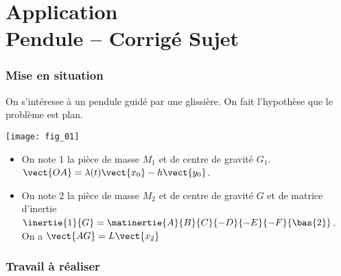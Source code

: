 \chapter*{Application  \\ 
Pendule -- \ifprof Corrigé \else Sujet \fi}

\iflivret {} \else
\ifprof  {} \else \fi
\fi

\setcounter{question}{0}
\marginnote{}



\subsection*{Mise en situation}
On s'intéresse à un pendule guidé par une glissière. On fait l'hypothèse que le problème est plan. 

\begin{marginfigure}
\texttt{[image: fig\_01]}
\end{marginfigure}

\begin{itemize}
\item On note 1 la pièce de masse $M_1$ et de centre de gravité $G_1$. $\vect{OA}=\lambda(t)\vect{x_0}-h\vect{y_0}$.
\item On note 2 la pièce de masse $M_2$ et de centre de gravité $G$ et de matrice d'inertie $\inertie{1}{G}= \matinertie{A}{B}{C}{-D}{-E}{-F}{\bas{2}}$. On a $\vect{AG}=L\vect{x_2}$
\end{itemize}

\subsection*{Travail à réaliser}

